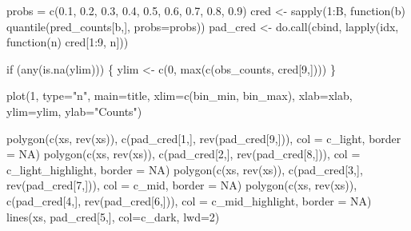\documentclass[
  letterpaper,
  DIV=11,
  numbers=noendperiod]{scrartcl}
\newenvironment{Shaded}{\begin{snugshade}}{\end{snugshade}}
\newcommand{\AttributeTok}[1]{\textcolor[rgb]{0.40,0.45,0.13}{#1}}
\newcommand{\ConstantTok}[1]{\textcolor[rgb]{0.56,0.35,0.01}{#1}}
\newcommand{\ControlFlowTok}[1]{\textcolor[rgb]{0.00,0.23,0.31}{#1}}
\newcommand{\DecValTok}[1]{\textcolor[rgb]{0.68,0.00,0.00}{#1}}
\newcommand{\FloatTok}[1]{\textcolor[rgb]{0.68,0.00,0.00}{#1}}
\newcommand{\FunctionTok}[1]{\textcolor[rgb]{0.28,0.35,0.67}{#1}}
\newcommand{\NormalTok}[1]{\textcolor[rgb]{0.00,0.23,0.31}{#1}}
\newcommand{\OtherTok}[1]{\textcolor[rgb]{0.00,0.23,0.31}{#1}}
\newcommand{\SpecialCharTok}[1]{\textcolor[rgb]{0.37,0.37,0.37}{#1}}
\newcommand{\StringTok}[1]{\textcolor[rgb]{0.13,0.47,0.30}{#1}}
\begin{document}
\begin{Shaded}
\begin{Highlighting}[]
\NormalTok{  probs }\OtherTok{=} \FunctionTok{c}\NormalTok{(}\FloatTok{0.1}\NormalTok{, }\FloatTok{0.2}\NormalTok{, }\FloatTok{0.3}\NormalTok{, }\FloatTok{0.4}\NormalTok{, }\FloatTok{0.5}\NormalTok{, }\FloatTok{0.6}\NormalTok{, }\FloatTok{0.7}\NormalTok{, }\FloatTok{0.8}\NormalTok{, }\FloatTok{0.9}\NormalTok{)}
\NormalTok{  cred }\OtherTok{\textless{}{-}} \FunctionTok{sapply}\NormalTok{(}\DecValTok{1}\SpecialCharTok{:}\NormalTok{B,}
                 \ControlFlowTok{function}\NormalTok{(b) }\FunctionTok{quantile}\NormalTok{(pred\_counts[b,], }\AttributeTok{probs=}\NormalTok{probs))}
\NormalTok{  pad\_cred }\OtherTok{\textless{}{-}} \FunctionTok{do.call}\NormalTok{(cbind, }\FunctionTok{lapply}\NormalTok{(idx, }\ControlFlowTok{function}\NormalTok{(n) cred[}\DecValTok{1}\SpecialCharTok{:}\DecValTok{9}\NormalTok{, n]))}

  \ControlFlowTok{if}\NormalTok{ (}\FunctionTok{any}\NormalTok{(}\FunctionTok{is.na}\NormalTok{(ylim))) \{}
\NormalTok{    ylim }\OtherTok{\textless{}{-}} \FunctionTok{c}\NormalTok{(}\DecValTok{0}\NormalTok{, }\FunctionTok{max}\NormalTok{(}\FunctionTok{c}\NormalTok{(obs\_counts, cred[}\DecValTok{9}\NormalTok{,])))}
\NormalTok{  \}}

  \FunctionTok{plot}\NormalTok{(}\DecValTok{1}\NormalTok{, }\AttributeTok{type=}\StringTok{"n"}\NormalTok{, }\AttributeTok{main=}\NormalTok{title,}
       \AttributeTok{xlim=}\FunctionTok{c}\NormalTok{(bin\_min, bin\_max), }\AttributeTok{xlab=}\NormalTok{xlab,}
       \AttributeTok{ylim=}\NormalTok{ylim, }\AttributeTok{ylab=}\StringTok{"Counts"}\NormalTok{)}

  \FunctionTok{polygon}\NormalTok{(}\FunctionTok{c}\NormalTok{(xs, }\FunctionTok{rev}\NormalTok{(xs)), }\FunctionTok{c}\NormalTok{(pad\_cred[}\DecValTok{1}\NormalTok{,], }\FunctionTok{rev}\NormalTok{(pad\_cred[}\DecValTok{9}\NormalTok{,])),}
          \AttributeTok{col =}\NormalTok{ c\_light, }\AttributeTok{border =} \ConstantTok{NA}\NormalTok{)}
  \FunctionTok{polygon}\NormalTok{(}\FunctionTok{c}\NormalTok{(xs, }\FunctionTok{rev}\NormalTok{(xs)), }\FunctionTok{c}\NormalTok{(pad\_cred[}\DecValTok{2}\NormalTok{,], }\FunctionTok{rev}\NormalTok{(pad\_cred[}\DecValTok{8}\NormalTok{,])),}
          \AttributeTok{col =}\NormalTok{ c\_light\_highlight, }\AttributeTok{border =} \ConstantTok{NA}\NormalTok{)}
  \FunctionTok{polygon}\NormalTok{(}\FunctionTok{c}\NormalTok{(xs, }\FunctionTok{rev}\NormalTok{(xs)), }\FunctionTok{c}\NormalTok{(pad\_cred[}\DecValTok{3}\NormalTok{,], }\FunctionTok{rev}\NormalTok{(pad\_cred[}\DecValTok{7}\NormalTok{,])),}
          \AttributeTok{col =}\NormalTok{ c\_mid, }\AttributeTok{border =} \ConstantTok{NA}\NormalTok{)}
  \FunctionTok{polygon}\NormalTok{(}\FunctionTok{c}\NormalTok{(xs, }\FunctionTok{rev}\NormalTok{(xs)), }\FunctionTok{c}\NormalTok{(pad\_cred[}\DecValTok{4}\NormalTok{,], }\FunctionTok{rev}\NormalTok{(pad\_cred[}\DecValTok{6}\NormalTok{,])),}
          \AttributeTok{col =}\NormalTok{ c\_mid\_highlight, }\AttributeTok{border =} \ConstantTok{NA}\NormalTok{)}
  \FunctionTok{lines}\NormalTok{(xs, pad\_cred[}\DecValTok{5}\NormalTok{,], }\AttributeTok{col=}\NormalTok{c\_dark, }\AttributeTok{lwd=}\DecValTok{2}\NormalTok{)}


\end{Highlighting}
\end{Shaded}
\end{document}
